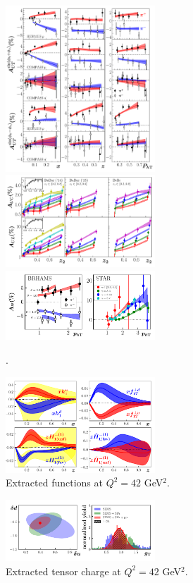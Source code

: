 \documentclass[twocolumn,prl,aps,superscriptaddress
               ,footinbib,amsfonts,amsmath,amssymb,showpacs]{revtex4-1}
\begin{document}
\begin{figure}[h!]
\includegraphics[width=0.5\textwidth]{gallery2/sidis.pdf}
\includegraphics[width=0.5\textwidth]{gallery2/sia.pdf}
\includegraphics[width=0.5\textwidth]{gallery2/an.pdf}
\caption{.} 
\label{f:SIDIS_Sivers}
\end{figure}

\begin{figure}[h!]
\includegraphics[width=0.5\textwidth]{gallery2/qcf.pdf}
\caption{Extracted functions at $Q^2=42$ GeV$^2$.} 
\label{f:qcf}
\end{figure}

\begin{figure}[h!]
\includegraphics[width=0.5\textwidth]{gallery2/gT.pdf}
\caption{Extracted tensor charge at $Q^2=42$ GeV$^2$.} 
\label{f:gT}
\end{figure}
\end{document}
